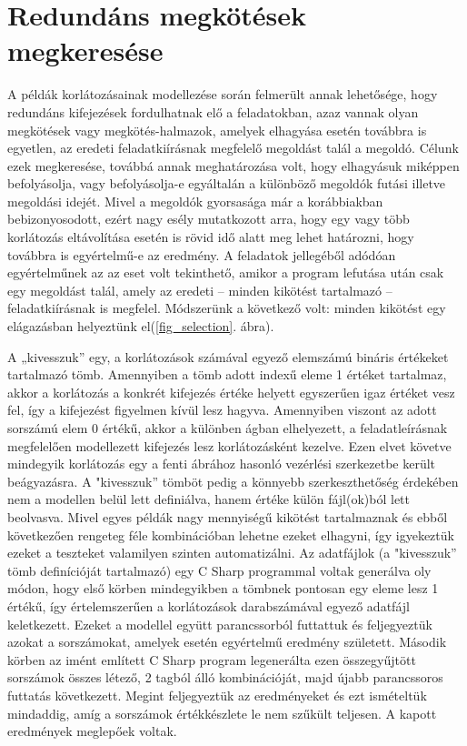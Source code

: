 \documentclass[12pt,a4paper,twoside, openright]{report}
\begin{document}
\chapter{Redundáns megkötések megkeresése}

    A példák korlátozásainak modellezése során felmerült annak lehetősége, hogy redundáns kifejezések fordulhatnak elő a feladatokban, azaz vannak olyan megkötések vagy megkötés-halmazok, amelyek elhagyása esetén továbbra is egyetlen, az eredeti feladatkiírásnak megfelelő megoldást talál a megoldó.
    Célunk ezek megkeresése, továbbá annak meghatározása volt, hogy elhagyásuk miképpen befolyásolja, vagy befolyásolja-e egyáltalán a különböző megoldók futási illetve megoldási idejét.
    Mivel a megoldók gyorsasága már a korábbiakban bebizonyosodott, ezért nagy esély mutatkozott arra, hogy  egy vagy több korlátozás eltávolítása esetén is rövid idő alatt meg lehet határozni, hogy továbbra is egyértelmű-e az eredmény.
    A feladatok jellegéből adódóan egyértelműnek az az eset volt tekinthető, amikor a program lefutása után csak egy megoldást talál, amely az eredeti – minden kikötést tartalmazó – feladatkiírásnak is megfelel.
    Módszerünk a következő volt: minden kikötést egy elágazásban helyeztünk el(\ref{fig_selection}. ábra).


    A „kivesszuk” egy, a korlátozások számával egyező elemszámú bináris értékeket tartalmazó tömb.
    Amennyiben a tömb adott indexű eleme 1 értéket tartalmaz, akkor a korlátozás a konkrét kifejezés értéke helyett egyszerűen igaz értéket vesz fel, így a kifejezést figyelmen kívül lesz hagyva.
    Amennyiben viszont az adott sorszámú elem 0 értékű, akkor a különben ágban elhelyezett, a feladatleírásnak megfelelően modellezett kifejezés lesz korlátozásként kezelve.
    Ezen elvet követve mindegyik korlátozás egy a fenti ábrához hasonló vezérlési szerkezetbe került beágyazásra.
    A "kivesszuk” tömböt pedig a könnyebb szerkeszthetőség érdekében nem a modellen belül lett definiálva, hanem értéke külön fájl(ok)ból lett beolvasva.
    Mivel egyes példák nagy mennyiségű kikötést tartalmaznak és ebből következően rengeteg féle kombinációban lehetne ezeket elhagyni, így igyekeztük ezeket a teszteket valamilyen szinten automatizálni.
    Az adatfájlok (a "kivesszuk” tömb definícióját tartalmazó) egy C Sharp programmal voltak generálva oly módon, hogy első körben mindegyikben a tömbnek pontosan egy eleme lesz 1 értékű, így értelemszerűen a korlátozások darabszámával egyező adatfájl keletkezett.
    Ezeket a modellel együtt parancssorból futtattuk és feljegyeztük azokat a sorszámokat, amelyek esetén egyértelmű eredmény született.
    Második körben az imént említett C Sharp program legenerálta ezen összegyűjtött sorszámok összes létező, 2 tagból álló kombinációját, majd újabb parancssoros futtatás következett.
    Megint feljegyeztük az eredményeket és ezt ismételtük mindaddig, amíg a sorszámok értékkészlete le nem szűkült teljesen.
    A kapott eredmények meglepőek voltak.
    
\end{document}
